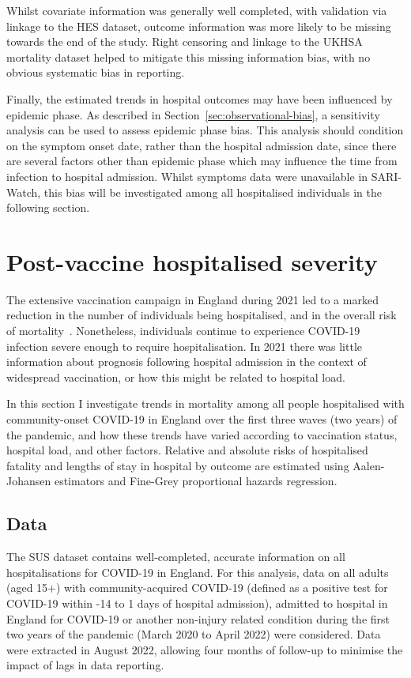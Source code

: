 Whilst covariate information was generally well completed, with validation via linkage to the HES dataset, outcome information was more likely to be missing towards the end of the study. Right censoring and linkage to the UKHSA mortality dataset helped to mitigate this missing information bias, with no obvious systematic bias in reporting.

Finally, the estimated trends in hospital outcomes may have been influenced by epidemic phase. As described in Section~\ref{sec:observational-bias}, a sensitivity analysis can be used to assess epidemic phase bias. This analysis should condition on the symptom onset date, rather than the hospital admission date, since there are several factors other than epidemic phase which may influence the time from infection to hospital admission. Whilst symptoms data were unavailable in SARI-Watch, this bias will be investigated among all hospitalised individuals in the following section.

\section{Post-vaccine hospitalised severity}

The extensive vaccination campaign in England during 2021 led to a marked reduction in the number of individuals being hospitalised, and in the overall risk of mortality~\parencite{Lopez_Bernal2021-gt, Thygesen2021-kg, UK_Health_Security_Agency2021-gw}. Nonetheless, individuals continue to experience COVID-19 infection severe enough to require hospitalisation. In 2021 there was little information about prognosis following hospital admission in the context of widespread vaccination, or how this might be related to hospital load.

In this section I investigate trends in mortality among all people hospitalised with community-onset COVID-19 in England over the first three waves (two years) of the pandemic, and how these trends have varied according to vaccination status, hospital load, and other factors. Relative and absolute risks of hospitalised fatality and lengths of stay in hospital by outcome are estimated using Aalen-Johansen estimators and Fine-Grey proportional hazards regression.

\subsection{Data}

The SUS dataset contains well-completed, accurate information on all hospitalisations for COVID-19 in England. For this analysis, data on all adults (aged 15+) with community-acquired COVID-19 (defined as a positive test for COVID-19 within -14 to 1 days of hospital admission), admitted to hospital in England for COVID-19 or another non-injury related condition during the first two years of the pandemic (March 2020 to April 2022) were considered. Data were extracted in August 2022, allowing four months of follow-up to minimise the impact of lags in data reporting.

